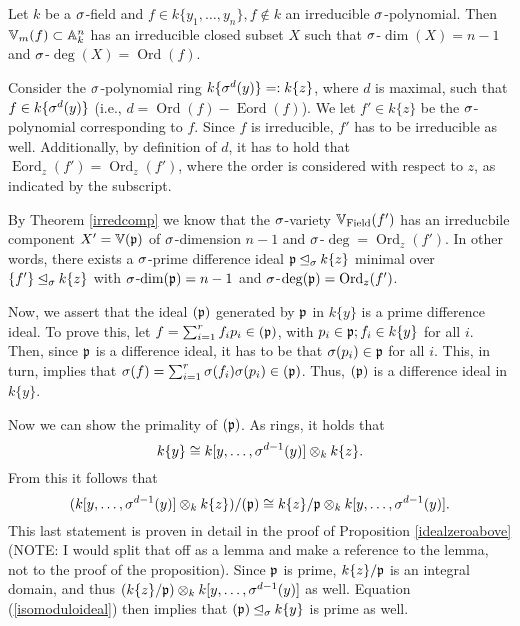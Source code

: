 \begin{cor}\label{corfinal}
Let $k$ be a $\sigma$-field and $f \in k\{y_1,\ldots,y_n\}, f \notin k$ an irreducible $\sigma$-polynomial. 
Then $\mathbb{V}_m(f) \subset \mathbb{A}_k^n$ has an irreducible closed subset $X$ such that $\sigma$-$\dim(X) = n-1$ and $\sigma$-$\operatorname{deg}(X) = \operatorname{Ord}(f)$.
\begin{bew}
Consider the $\sigma$-polynomial ring $k\{\sigma^d(y)\} =: k\{z\}$, where $d$ is maximal, such that $f \in k\{\sigma^d(y)\}$ (i.e., $d = \operatorname{Ord}(f) - \operatorname{Eord}(f)$). We let $f'\in k\{z\}$ be the $\sigma$-polynomial corresponding to $f$. 
Since $f$ is irreducible, $f'$ has to be irreducible as well. Additionally, by definition of $d$, it has to hold that $\operatorname{Eord}_z(f') = \operatorname{Ord}_z(f')$, where the order is considered with respect to $z$,
as indicated by the subscript. 

By Theorem \ref{irredcomp} we know that the $\sigma$-variety $ \mathbb{V}_{\operatorname{Field}}(f')$ has an irreducbile component $X' = \mathbb{V}(\mathfrak{p})$ of $\sigma$-dimension $n-1$ and $\sigma$-$\operatorname{deg} = \operatorname{Ord}_z(f')$. In other words, there exists a $\sigma$-prime difference ideal $\mathfrak{p} \unlhd_{\sigma} k\{z\}$ minimal over $\{f'\} \unlhd_{\sigma} k\{z\}$ with
$\sigma$-$\dim(\mathfrak{p}) = n-1$ and $\sigma$-$\operatorname{deg}(\mathfrak{p}) = \operatorname{Ord}_z(f')$. 

Now, we assert that the ideal $(\mathfrak{p})$ generated by $\mathfrak{p}$ in $k\{y\}$ is a prime difference ideal. 
To prove this, let $f = \sum_{i=1}^r f_i p_i \in (\mathfrak{p})$, with $p_i \in \mathfrak{p}; f_i \in k\{y\}$ for all $i$. Then, since $\mathfrak{p}$ is a difference ideal, it has to be that $\sigma(p_i) \in \mathfrak{p}$ for all $i$.
This, in turn, implies that $\sigma(f) =  \sum_{i=1}^r \sigma(f_i) \sigma(p_i) \in (\mathfrak{p})$. Thus, $(\mathfrak{p})$ is a difference ideal in $k\{y\}$. 

Now we can show the primality of $(\mathfrak{p})$. As rings, it holds that $$k\{y\} \cong k[y,\ldots,\sigma^{d-1}(y)] \otimes_k k\{z\}.$$
From this it follows that 
\begin{equation}\label{isomoduloideal} (k[y,\ldots,\sigma^{d-1}(y)] \otimes_k k\{z\}) / (\mathfrak{p}) \cong k\{z\} / \mathfrak{p} \otimes_k k[y,\ldots,\sigma^{d-1}(y)]. \end{equation}
This last statement is proven in detail in the proof of Proposition \ref{idealzeroabove} (NOTE: I would split that off as a lemma and make a reference to the lemma, not to the proof of the proposition).
Since $\mathfrak{p}$ is prime, $k\{z\}/\mathfrak{p}$ is an integral domain, and thus $(k\{z\}/\mathfrak{p}) \otimes_k k[y,\ldots,\sigma^{d-1}(y)]$ as well.
Equation (\ref{isomoduloideal}) then implies that $(\mathfrak{p}) \unlhd_{\sigma} k\{y\}$ is prime as well. 


\end{bew}
\end{cor}
